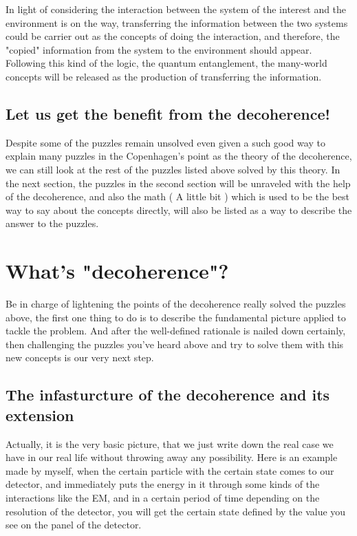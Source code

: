 \documentclass[final,1p,12pt]{elsarticle}
\begin{document}
In light of considering the interaction between the system of the interest and the environment is on the way, transferring the information between the two systems could be carrier out as the concepts of doing the interaction, and therefore, the "copied" information from the system to the environment should appear. Following this kind of the logic, the quantum entanglement, the many-world concepts will be released as the production of transferring the information.\\

\subsection{Let us get the benefit from the decoherence!}
Despite some of the puzzles remain unsolved even given a such good way to explain many puzzles in the Copenhagen's point as the theory of the decoherence, we can still look at the rest of the puzzles listed above solved by this theory. In the next section, the puzzles in the second section will be unraveled with the help of the decoherence, and also the math ( A little bit ) which is used to be the best way to say about the concepts directly, will also be listed as a way to describe the answer to the puzzles.\\

\section{What's "decoherence"?}
Be in charge of lightening the points of the decoherence\cite{joos1999elements} really solved the puzzles above, the first one thing to do is to describe the fundamental picture applied to tackle the problem. And after the well-defined rationale is nailed down certainly, then challenging the puzzles you've heard above and try to solve them with this new concepts is our very next step. \\
\subsection{The infasturcture of the decoherence and its extension}
Actually, it is the very basic picture, that we just write down the real case we have in our real life without throwing away any possibility. Here is an example made by myself, when the certain particle with the certain state comes to our detector, and immediately puts the energy in it through some kinds of the interactions like the EM, and in a certain period of time depending on the resolution of the detector, you will get the certain state defined by the value you see on the panel of the detector. \\
\end{document}
